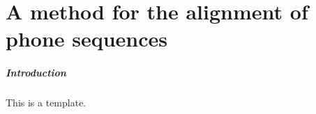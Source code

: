 \chapter{A method for the alignment of phone sequences}\label{ch:alignment}

\paragraph{Introduction}
This is a template.


